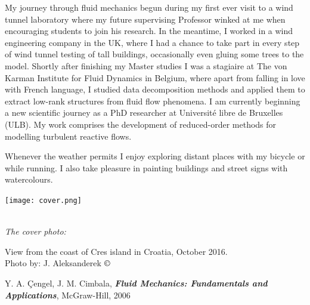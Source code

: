 \documentclass[10pt]{report}
\begin{document}
My journey through fluid mechanics begun during my first ever visit to a wind tunnel laboratory where my future supervising Professor winked at me when encouraging students to join his research. In the meantime, I worked in a wind engineering company in the UK, where I had a chance to take part in every step of wind tunnel testing of tall buildings, occasionally even gluing some trees to the model. Shortly after finishing my Master studies I was a stagiaire at The von Karman Institute for Fluid Dynamics in Belgium, where apart from falling in love with French language, I studied data decomposition methods and applied them to extract low-rank structures from fluid flow phenomena. I am currently beginning a new scientific journey as a PhD researcher at Université libre de Bruxelles (ULB). My work comprises the development of reduced-order methods for modelling turbulent reactive flows.

Whenever the weather permits I enjoy exploring distant places with my bicycle or while running. I also take pleasure in painting buildings and street signs with watercolours.

\begin{flushright}


\texttt{[image: cover.png]}

\setlength{\parskip}{0.1em}
\setlength{\parindent}{0cm}
\ \\[0.5cm]
\textit{The cover photo:}  

View from the coast of Cres island in Croatia, October 2016.
\ \\[0.1cm]
Photo by: J. Aleksanderek $\copyright$
\end{flushright}




\begin{thebibliography}{50}

\item Y. A. Çengel, J. M. Cimbala, \textbf{\textit{Fluid Mechanics: Fundamentals and Applications}}, McGraw-Hill, 2006
\item
\item
\item
\item
\item 

\item 
\item
\item
\item
\item
\item 

\item 
\item
\item
\item
\item
\item 
\thispagestyle{empty}
\end{thebibliography}
\end{document}
